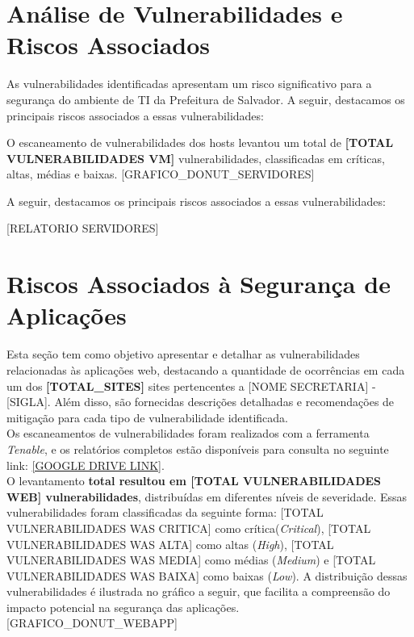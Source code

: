 \documentclass[a4paper,12pt]{article}
\begin{document}
\section{Análise de Vulnerabilidades e Riscos Associados}
As vulnerabilidades identificadas apresentam um risco significativo para a segurança do ambiente de TI da Prefeitura de Salvador.
A seguir, destacamos os principais riscos associados a essas vulnerabilidades:

O escaneamento de vulnerabilidades dos hosts levantou um total de \textbf{[TOTAL VULNERABILIDADES VM]} vulnerabilidades, classificadas em críticas, altas, médias e baixas.
    [GRAFICO_DONUT_SERVIDORES]

A seguir, destacamos os principais riscos associados a essas vulnerabilidades: 

[RELATORIO SERVIDORES]

\section{Riscos Associados à Segurança de Aplicações}

Esta seção tem como objetivo apresentar e detalhar as vulnerabilidades relacionadas às aplicações web, destacando a quantidade de ocorrências em cada um dos \textbf{[TOTAL_SITES]} sites pertencentes a [NOME SECRETARIA] - [SIGLA].
Além disso, são fornecidas descrições detalhadas e recomendações de mitigação para cada tipo de vulnerabilidade identificada.\\

Os escaneamentos de vulnerabilidades foram realizados com a ferramenta \textit{Tenable}, e os relatórios completos estão disponíveis para consulta no seguinte link: \url{[GOOGLE DRIVE LINK]}.\\

O levantamento \textbf{total resultou em [TOTAL VULNERABILIDADES WEB] vulnerabilidades}, distribuídas em diferentes níveis de severidade.
Essas vulnerabilidades foram classificadas da seguinte forma: [TOTAL VULNERABILIDADES WAS CRITICA] como crítica(\textit{Critical}), [TOTAL VULNERABILIDADES WAS ALTA] como altas (\textit{High}), [TOTAL VULNERABILIDADES WAS MEDIA] como médias (\textit{Medium}) e [TOTAL VULNERABILIDADES WAS BAIXA] como baixas (\textit{Low}).
A distribuição dessas vulnerabilidades é ilustrada no gráfico a seguir, que facilita a compreensão do impacto potencial na segurança das aplicações.
[GRAFICO_DONUT_WEBAPP] %
\FloatBarrier
\end{document}

